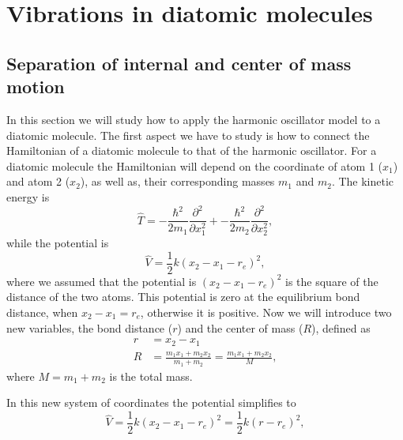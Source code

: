 \documentclass[../Main/chem331-notes.tex]{subfiles}
\begin{document}
\setcounter{section}{9}

\section{Vibrations in diatomic molecules}
\subsection{Separation of internal and center of mass motion}
In this section we will study how to apply the harmonic oscillator model to a diatomic molecule.
The first aspect we have to study is how to connect the Hamiltonian of a diatomic molecule to that of the harmonic oscillator.
For a diatomic molecule the Hamiltonian will depend on the coordinate of atom 1 ($x_1$) and atom 2 ($x_2$), as well as, their corresponding masses $m_1$ and $m_2$.
The kinetic energy is
\begin{equation}
\hat{T} = -\frac{\hbar^2}{2 m_1} \frac{\partial^2}{\partial x_1^2} + -\frac{\hbar^2}{2 m_2} \frac{\partial^2}{\partial x_2^2},
\end{equation}
while the potential is
\begin{equation}
\hat{V} = \frac{1}{2} k (x_2 - x_1 - r_e)^2,
\end{equation}
where we assumed that the potential is $(x_2 - x_1 - r_e)^2$ is the square of the distance of the two atoms.
This potential is zero at the equilibrium bond distance, when $x_2 - x_1 = r_e$, otherwise it is positive.
Now we will introduce two new variables, the bond distance ($r$) and the center of mass ($R$), defined as
\begin{align}
r & = x_2 - x_1 \\
R & = \frac{m_1 x_1 + m_2 x_2}{m_1 + m_2} = \frac{m_1 x_1 + m_2 x_2}{M},
\end{align}
where $M = m_1 + m_2$ is the total mass.

In this new system of coordinates the potential simplifies to
\begin{equation}
\hat{V} = \frac{1}{2} k (x_2 - x_1 - r_e)^2 = \frac{1}{2} k (r - r_e)^2,
\end{equation}
\end{document}
